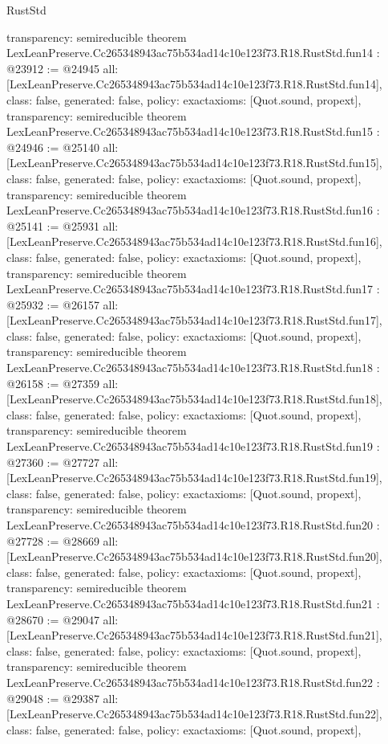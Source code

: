 \begin{lexlean}{RustStd}
\begin{coremodule}
{  transparency: semireducible
}
theorem LexLeanPreserve.Cc265348943ac75b534ad14c10e123f73.R18.RustStd.fun14 : @23912 := @24945 {
  all: [LexLeanPreserve.Cc265348943ac75b534ad14c10e123f73.R18.RustStd.fun14],
  class: false,
  generated: false,
  policy: exact{axioms: [Quot.sound, propext]},
  transparency: semireducible
}
theorem LexLeanPreserve.Cc265348943ac75b534ad14c10e123f73.R18.RustStd.fun15 : @24946 := @25140 {
  all: [LexLeanPreserve.Cc265348943ac75b534ad14c10e123f73.R18.RustStd.fun15],
  class: false,
  generated: false,
  policy: exact{axioms: [Quot.sound, propext]},
  transparency: semireducible
}
theorem LexLeanPreserve.Cc265348943ac75b534ad14c10e123f73.R18.RustStd.fun16 : @25141 := @25931 {
  all: [LexLeanPreserve.Cc265348943ac75b534ad14c10e123f73.R18.RustStd.fun16],
  class: false,
  generated: false,
  policy: exact{axioms: [Quot.sound, propext]},
  transparency: semireducible
}
theorem LexLeanPreserve.Cc265348943ac75b534ad14c10e123f73.R18.RustStd.fun17 : @25932 := @26157 {
  all: [LexLeanPreserve.Cc265348943ac75b534ad14c10e123f73.R18.RustStd.fun17],
  class: false,
  generated: false,
  policy: exact{axioms: [Quot.sound, propext]},
  transparency: semireducible
}
theorem LexLeanPreserve.Cc265348943ac75b534ad14c10e123f73.R18.RustStd.fun18 : @26158 := @27359 {
  all: [LexLeanPreserve.Cc265348943ac75b534ad14c10e123f73.R18.RustStd.fun18],
  class: false,
  generated: false,
  policy: exact{axioms: [Quot.sound, propext]},
  transparency: semireducible
}
theorem LexLeanPreserve.Cc265348943ac75b534ad14c10e123f73.R18.RustStd.fun19 : @27360 := @27727 {
  all: [LexLeanPreserve.Cc265348943ac75b534ad14c10e123f73.R18.RustStd.fun19],
  class: false,
  generated: false,
  policy: exact{axioms: [Quot.sound, propext]},
  transparency: semireducible
}
theorem LexLeanPreserve.Cc265348943ac75b534ad14c10e123f73.R18.RustStd.fun20 : @27728 := @28669 {
  all: [LexLeanPreserve.Cc265348943ac75b534ad14c10e123f73.R18.RustStd.fun20],
  class: false,
  generated: false,
  policy: exact{axioms: [Quot.sound, propext]},
  transparency: semireducible
}
theorem LexLeanPreserve.Cc265348943ac75b534ad14c10e123f73.R18.RustStd.fun21 : @28670 := @29047 {
  all: [LexLeanPreserve.Cc265348943ac75b534ad14c10e123f73.R18.RustStd.fun21],
  class: false,
  generated: false,
  policy: exact{axioms: [Quot.sound, propext]},
  transparency: semireducible
}
theorem LexLeanPreserve.Cc265348943ac75b534ad14c10e123f73.R18.RustStd.fun22 : @29048 := @29387 {
  all: [LexLeanPreserve.Cc265348943ac75b534ad14c10e123f73.R18.RustStd.fun22],
  class: false,
  generated: false,
  policy: exact{axioms: [Quot.sound, propext]},
}
\end{coremodule}
\end{lexlean}
